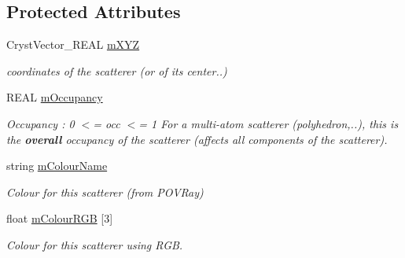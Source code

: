 \subsection*{Protected Attributes}
\begin{DoxyCompactItemize}
\item 
\mbox{\label{class_obj_cryst_1_1_scatterer_a9cc523b07c82846bf0ddc3ce0e74bcc6}} 
Cryst\+Vector\+\_\+\+R\+E\+AL \mbox{\hyperlink{class_obj_cryst_1_1_scatterer_a9cc523b07c82846bf0ddc3ce0e74bcc6}{m\+X\+YZ}}
\begin{DoxyCompactList}\small\item\em coordinates of the scatterer (or of its center..) \end{DoxyCompactList}\item 
\mbox{\label{class_obj_cryst_1_1_scatterer_ae51b357e1cf9f523994f0e08c70bb489}} 
R\+E\+AL \mbox{\hyperlink{class_obj_cryst_1_1_scatterer_ae51b357e1cf9f523994f0e08c70bb489}{m\+Occupancy}}
\begin{DoxyCompactList}\small\item\em Occupancy \+: 0 $<$= occ $<$= 1 For a multi-\/atom scatterer (polyhedron,..), this is the {\bfseries{overall}} occupancy of the scatterer (affects all components of the scatterer). \end{DoxyCompactList}\item 
\mbox{\label{class_obj_cryst_1_1_scatterer_a1d1166aabc3a811ca70e37d2ad03ba05}} 
string \mbox{\hyperlink{class_obj_cryst_1_1_scatterer_a1d1166aabc3a811ca70e37d2ad03ba05}{m\+Colour\+Name}}
\begin{DoxyCompactList}\small\item\em Colour for this scatterer (from P\+O\+V\+Ray) \end{DoxyCompactList}\item 
\mbox{\label{class_obj_cryst_1_1_scatterer_ab62464d3d132a8e70f283648ae9ea020}} 
float \mbox{\hyperlink{class_obj_cryst_1_1_scatterer_ab62464d3d132a8e70f283648ae9ea020}{m\+Colour\+R\+GB}} \mbox{[}3\mbox{]}
\begin{DoxyCompactList}\small\item\em Colour for this scatterer using R\+GB. \end{DoxyCompactList}\item 

\end{DoxyCompactItemize}
